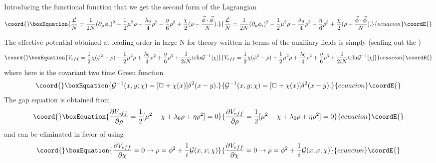 \documentclass[a4paper,prd,preprint,superscriptaddress,showpacs,byrevtex]{revtex4}
\begin{document}
Introducing the functional \myHighlight{$\delta$}\coordHE{} function that \coordHE{} we get the second form of the Lagrangian
\begin{equation}\coord{}\boxEquation{ 
\frac {\cal L}{N}  = \frac{1}{2 N} (\partial_\mu \phi_i)^2 -
\frac{1}{2}
\mu^2  \rho  -\frac{\lambda_0}{4} \rho^2-
\frac{\eta}{6 }
\rho^3 + \frac{\chi}{2} (\rho - \frac{\vec \phi \cdot \vec \phi}{N}).
}{ 
\frac {\cal L}{N}  = \frac{1}{2 N} (\partial_\mu \phi_i)^2 -
\frac{1}{2}
\mu^2  \rho  -\frac{\lambda_0}{4} \rho^2-
\frac{\eta}{6 }
\rho^3 + \frac{\chi}{2} (\rho - \frac{\vec \phi \cdot \vec \phi}{N}).
}{ecuacion}\coordE{}\end{equation}

The effective potential obtained at leading order in large N for \coordHE{}
theory written in terms of
the auxiliary fields \myHighlight{$\chi,\rho$}\coordHE{} is simply (scaling out the \coordHE{})
\begin{equation}\coord{}\boxEquation{
V_{eff}=  \frac{1}{2} \chi( \phi^2 - \rho)  +\frac{1}{2} \mu^2 \rho + \frac
{\lambda_0}{ 4} \rho^2 +
\frac{\eta}{6} \rho^3 + \frac{1}{2iN} {\rm tr} {\ln} {\mathcal
G}^{-1}[\chi]
}{
V_{eff}=  \frac{1}{2} \chi( \phi^2 - \rho)  +\frac{1}{2} \mu^2 \rho + \frac
{\lambda_0}{ 4} \rho^2 +
\frac{\eta}{6} \rho^3 + \frac{1}{2iN} {\rm tr} {\ln} {\mathcal
G}^{-1}[\chi]
}{ecuacion}\coordE{}\end{equation}
where here \coordHE{} is the covariant two time Green function
\begin{equation}\coord{}\boxEquation{
{\mathcal G}^{-1}(x,y;\chi)= [\Box + \chi(x)] \delta^2 (x-y).
}{
{\mathcal G}^{-1}(x,y;\chi)= [\Box + \chi(x)] \delta^2 (x-y).
}{ecuacion}\coordE{}\end{equation}
The gap equation  is obtained from
\begin{equation}\coord{}\boxEquation{
\frac{\partial V_{eff}}{\partial \rho} = \frac{1}{2} [\mu^2 - \chi+\lambda_0 \rho
+ \eta \rho^2]= 0
}{
\frac{\partial V_{eff}}{\partial \rho} = \frac{1}{2} [\mu^2 - \chi+\lambda_0 \rho
+ \eta \rho^2]= 0
}{ecuacion}\coordE{}\end{equation}
and \myHighlight{$\rho$}\coordHE{} can be eliminated in favor of \myHighlight{$\chi$}\coordHE{} using
\begin{equation}\coord{}\boxEquation{
\frac{\partial V_{eff}}{\partial \chi} =0 \rightarrow \rho=\phi^2 + \frac{1}{i}
{\mathcal G}(x,x;\chi)
}{
\frac{\partial V_{eff}}{\partial \chi} =0 \rightarrow \rho=\phi^2 + \frac{1}{i}
{\mathcal G}(x,x;\chi)
}{ecuacion}\coordE{}\end{equation}
\end{document}

